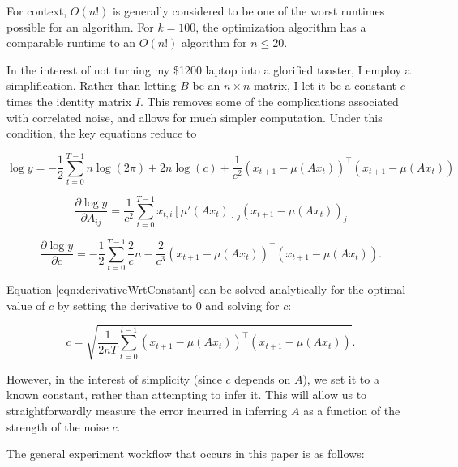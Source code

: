 \documentclass{article}
\theoremstyle{definition}
\begin{document}
For context, $O(n!)$ is generally considered to be one of the worst runtimes possible for an algorithm. For $k=100$, the optimization algorithm has a comparable runtime to an $O(n!)$ algorithm for $n \leq 20$. 

In the interest of not turning my \$1200 laptop into a glorified toaster, I employ a simplification. Rather than letting $B$ be an $n \times n$ matrix, I let it be a constant $c$ times the identity matrix $I$. This removes some of the complications associated with correlated noise, and allows for much simpler computation. Under this condition, the key equations reduce to

\begin{equation}
    \label{eqn:simpleLikelihood}
    \log y = -\frac{1}{2} \sum_{t=0}^{T-1} n \log(2\pi) + 2n \log(c) + \frac{1}{c^2}(x_{t+1} - \mu(Ax_t))^\top (x_{t+1} - \mu(Ax_t))
\end{equation}

\begin{equation}
    \label{eqn:simpleGradAElement}
    \frac{\partial \log y}{\partial A_{ij}} = \frac{1}{c^2} \sum_{t=0}^{T-1} x_{t,i} [\mu'(Ax_t)]_j (x_{t+1} - \mu(Ax_t))_j
\end{equation}

\begin{equation}
    \label{eqn:derivativeWrtConstant}
    \frac{\partial \log y}{\partial c} = - \frac{1}{2} \sum_{t=0}^{T-1} \frac{2}{c} n - \frac{2}{c^3} (x_{t+1} - \mu(Ax_t))^\top (x_{t+1} - \mu(Ax_t)).
\end{equation}

Equation \ref{eqn:derivativeWrtConstant} can be solved analytically for the optimal value of $c$ by setting the derivative to $0$ and solving for $c$:

\begin{equation}
    c = \sqrt{\frac{1}{2nT} \sum_{t=0}^{t-1} (x_{t+1} - \mu(Ax_t))^\top (x_{t+1} - \mu(Ax_t))}.
\end{equation}

However, in the interest of simplicity (since $c$ depends on $A$), we set it to a known constant, rather than attempting to infer it. This will allow us to straightforwardly measure the error incurred in inferring $A$ as a function of the strength of the noise $c$.

The general experiment workflow that occurs in this paper is as follows:
\end{document}
